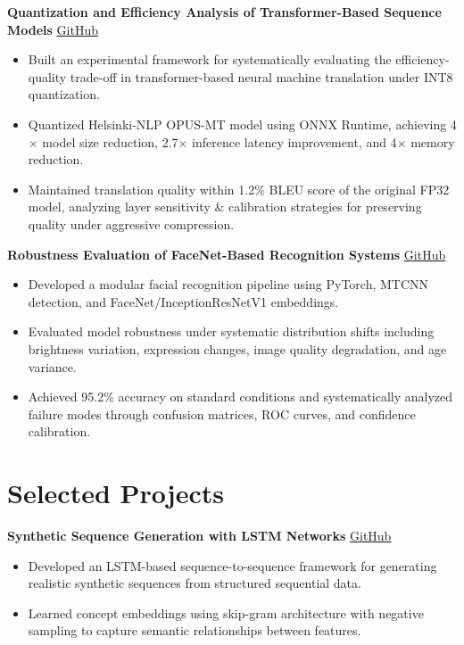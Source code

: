\documentclass[10.5pt,a4paper]{article}
\begin{document}
\noindent\textbf{Quantization and Efficiency Analysis of Transformer-Based Sequence Models}
\hfill
\href{https://github.com/SaadARazzaq/onnx-translation-optimization}{\underline{GitHub}}
\begin{itemize}
    \item Built an experimental framework for systematically evaluating the efficiency-quality trade-off in transformer-based neural machine translation under INT8 quantization.
    \item Quantized Helsinki-NLP OPUS-MT model using ONNX Runtime, achieving 4$\times$ model size reduction, 2.7$\times$ inference latency improvement, and 4$\times$ memory reduction.
    \item Maintained translation quality within 1.2\% BLEU score of the original FP32 model, analyzing layer sensitivity \& calibration strategies for preserving quality under aggressive compression.
\end{itemize}

\vspace{4pt}

\noindent\textbf{Robustness Evaluation of FaceNet-Based Recognition Systems}
\hfill
\href{https://github.com/SaadARazzaq/nn-face-recognition}{\underline{GitHub}}
\begin{itemize}
    \item Developed a modular facial recognition pipeline using PyTorch, MTCNN detection, and FaceNet/InceptionResNetV1 embeddings.
    \item Evaluated model robustness under systematic distribution shifts including brightness variation, expression changes, image quality degradation, and age variance.
    \item Achieved 95.2\% accuracy on standard conditions and systematically analyzed failure modes through confusion matrices, ROC curves, and confidence calibration.
\end{itemize}


\section*{Selected Projects}

\noindent\textbf{Synthetic Sequence Generation with LSTM Networks}
\hfill
\href{https://github.com/SaadARazzaq/medical-record-synthesis-rnn}{\underline{GitHub}}
\begin{itemize}
    \item Developed an LSTM-based sequence-to-sequence framework for generating realistic synthetic sequences from structured sequential data.
    \item Learned concept embeddings using skip-gram architecture with negative sampling to capture semantic relationships between features.
\end{itemize}
\end{document}
